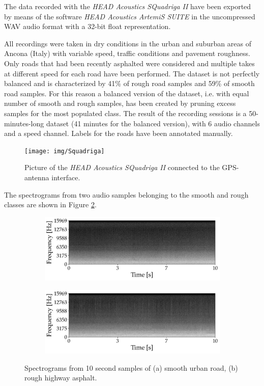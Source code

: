 The data recorded with the \textit{HEAD Acoustics SQuadriga II} have been exported by means of the software \textit{HEAD Acoustics ArtemiS SUITE} in the uncompressed WAV audio format with a 32-bit float representation.

All recordings were taken in dry conditions in the urban and suburban areas of Ancona (Italy) with variable speed, traffic conditions and pavement roughness. Only roads that had been recently asphalted were considered and multiple takes at different speed for each road have been performed. The dataset is not perfectly balanced and is characterized by 41\% of rough road samples and 59\% of smooth road samples. For this reason a balanced version of the dataset, i.e. with equal number of smooth and rough samples, has been created by pruning excess samples for the most populated class. 
The result of the recording sessions is a 50-minutes-long dataset (41 minutes for the balanced version), with 6 audio channels and a speed channel. Labels for the roads have been annotated manually.

\begin{figure}[h]
	\centering
	\texttt{[image: img/Squadriga]}
	\caption[HEAD Acoustics SQuadriga II]{Picture of the \textit{HEAD Acoustics SQuadriga II} connected to the GPS-antenna interface.}
	\label{fig:car-Squadriga}
\end{figure}

The spectrograms from two audio samples belonging to the smooth and rough classes are shown in Figure \ref{fig:road_spectrograms}.

\begin{figure}[ht]
	\centering
	\begin{subfigure}[b]{0.48\textwidth}
		\includegraphics[width=\textwidth]{img/specgram_REC007}
	\end{subfigure}
	\hfil
	\begin{subfigure}[b]{0.48\textwidth}
		\includegraphics[width=\textwidth]{img/specgram_REC015}
	\end{subfigure}
	\caption[Road noise spectrograms]{Spectrograms from 10 second samples of (a) smooth urban road, (b) rough highway asphalt.}
\label{fig:road_spectrograms}
\end{figure}


